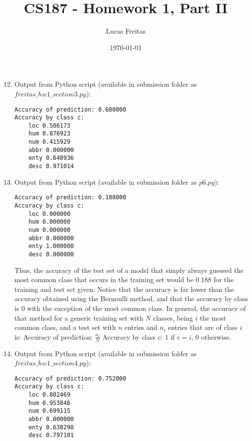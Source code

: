 \documentclass[11pt]{article}
\title{CS187 - Homework 1, Part II}
\author{Lucas Freitas}
\date{\today}
\begin{document}
\maketitle
\begin {enumerate}
\setcounter{enumi}{11}

\item
Output from Python script (available in submission folder as $freitas\_hw1\_section3.py$):
\begin{verbatim}
Accuracy of prediction: 0.680000
Accuracy by class c:
    loc 0.506173
    hum 0.876923
    num 0.415929
    abbr 0.000000
    enty 0.648936
    desc 0.971014
\end{verbatim}

\item
Output from Python script (available in submission folder as $p6.py$):
\begin{verbatim}
Accuracy of prediction: 0.188000
Accuracy by class c:
    loc 0.000000
    hum 0.000000
    num 0.000000
    abbr 0.000000
    enty 1.000000
    desc 0.000000
\end{verbatim}
Thus, the accuracy of the test set of a model that simply always guessed the most common class that occurs in the training set would be $0.188$ for the training and test set given. Notice that the accuracy is far lower than the accuracy obtained using the Bernoulli method, and that the accuracy by class is $0$ with the exception of the most common class. In general, the accuracy of that method for a generic training set with $N$ classes, being $i$ the most common class, and a test set with $n$ entries and $n_i$ entries that are of class $i$ is:
\newline
\newline
Accuracy of prediction: $\frac{n_i}{N}$
\newline
Accuracy by class c: $1$ if $c = i$, $0$ otherwise.

\item
Output from Python script (available in submission folder as $freitas\_hw1\_section4.py$):
\begin{verbatim}
Accuracy of prediction: 0.752000
Accuracy by class c:
    loc 0.802469
    hum 0.953846
    num 0.699115
    abbr 0.000000
    enty 0.638298
    desc 0.797101
\end{verbatim}


\end{enumerate}
\end{document}
